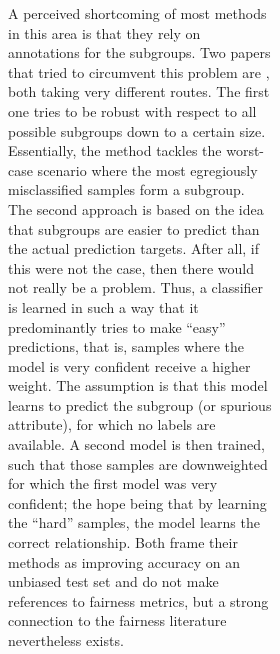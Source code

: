 \begin{figure}[tp]
\begin{subfigure}[b]{0.4\textwidth}
\begin{subfigure}[b]{0.4\textwidth}
A perceived shortcoming of most methods in this area is that they rely on annotations for the
subgroups. Two papers that tried to circumvent this problem are
\citet{HasSriNamLia18,nam2020learning}, both taking very different routes. The first one tries to
be robust with respect to all possible subgroups down to a certain size. Essentially, the method
tackles the worst-case scenario where the most egregiously misclassified samples form a subgroup.
The second approach is based on the idea that subgroups are easier to predict than the actual
prediction targets. After all, if this were not the case, then there would not really be a problem.
Thus, a classifier is learned in such a way that it predominantly tries to make ``easy''
predictions, that is, samples where the model is very confident receive a higher weight. The
assumption is that this model learns to predict the subgroup (or spurious attribute), for which no
labels are available. A second model is then trained, such that those samples are downweighted for
which the first model was very confident; the hope being that by learning the ``hard'' samples, the
model learns the correct relationship. Both \citet{HasSriNamLia18,nam2020learning} frame their
methods as improving accuracy on an unbiased test set and do not make references to fairness
metrics, but a strong connection to the fairness literature nevertheless exists.





\end{subfigure}
\end{subfigure}
\end{figure}
